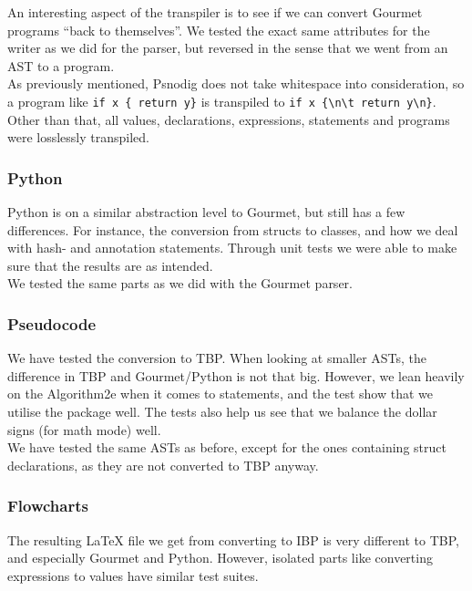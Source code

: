 An interesting aspect of the transpiler is to see if we can convert Gourmet programs ``back to themselves''. We tested the exact same attributes for the writer as we did for the parser, but reversed in the sense that we went from an AST to a program. \\

As previously mentioned, Psnodig does not take whitespace into consideration, so a program like \texttt{if x \{ return y\}} is transpiled to \texttt{if x \{\textbackslash n\textbackslash t return y\textbackslash n\}}. Other than that, all values, declarations, expressions, statements and programs were losslessly transpiled.

\subsubsection{Python}

Python is on a similar abstraction level to Gourmet, but still has a few differences. For instance, the conversion from structs to classes, and how we deal with hash- and annotation statements. Through unit tests we were able to make sure that the results are as intended. \\

We tested the same parts as we did with the Gourmet parser.

\subsubsection{Pseudocode}

We have tested the conversion to TBP. When looking at smaller ASTs, the difference in TBP and Gourmet/Python is not that big. However, we lean heavily on the Algorithm2e when it comes to statements, and the test show that we utilise the package well. The tests also help us see that we balance the dollar signs (for math mode) well. \\

We have tested the same ASTs as before, except for the ones containing struct declarations, as they are not converted to TBP anyway.

\subsubsection{Flowcharts}

The resulting LaTeX file we get from converting to IBP is very different to TBP, and especially Gourmet and Python. However, isolated parts like converting expressions to values have similar test suites. \\

